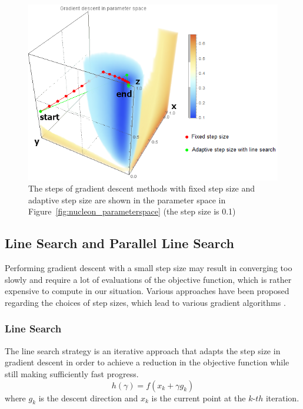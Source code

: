 \begin{figure}
	\centering
	\begin{minipage}{.9\textwidth}
		\includegraphics[width=1\linewidth]{images/nucleon_strong_red_parameterspace_path}
	\end{minipage}
	\caption[The steps of gradient descent methods with fixed step size and adaptive step size are shown in the parameter space]{The steps of gradient descent methods with fixed step size and adaptive step size are shown in the parameter space in Figure~\ref{fig:nucleon_parameterspace} (the step size is 0.1)}
	\label{fig:nucleon_parameterspace_path}
\end{figure}

\subsection{Line Search and Parallel Line Search}
Performing gradient descent with a small step size may result in converging too slowly and require a lot of evaluations of the objective function, which is rather expensive to compute in our situation. Various approaches have been proposed regarding the choices of step sizes, which lead to various gradient algorithms \cite{yuan_step-sizes_2008}.

\subsubsection{Line Search}
The line search strategy is an iterative approach that adapts the step size in gradient descent in order to achieve a reduction in the objective function while still making sufficiently fast progress.
\[ h( \gamma)=f(x_{k}+\gamma g_{k}) \]
where $ g_{k} $ is the descent direction and $ x_{k} $ is the current point at the $ k$-$th $ iteration.

